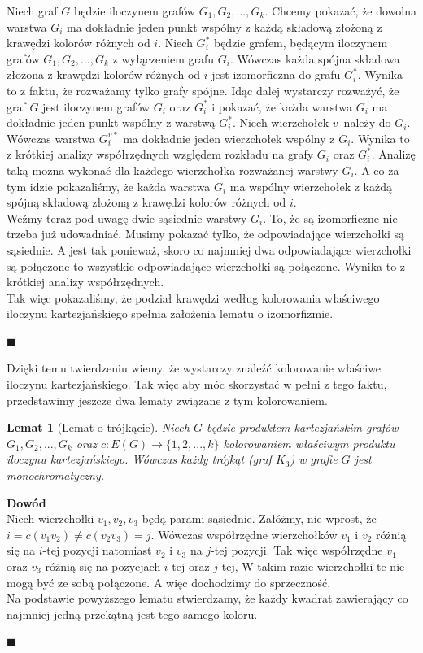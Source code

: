 \documentclass[12pt,a4paper,titlepage]{article}
\newtheorem{lem}[twr]{Lemat}
\newcommand\tab[1][1cm]{\hspace*{#1}}
\begin{document}
\tab[0.6cm]Niech graf $G$ będzie iloczynem grafów $G_1, G_2, ..., G_k$. Chcemy pokazać, że dowolna warstwa $G_i$ ma dokładnie jeden punkt wspólny z każdą składową złożoną z krawędzi kolorów różnych od $i$. Niech $G_i ^*$ będzie grafem, będącym iloczynem grafów $G_1, G_2, ..., G_k$ z wyłączeniem grafu $G_i$. Wówczas każda spójna składowa złożona z krawędzi kolorów różnych od $i$ jest izomorficzna do grafu $G_i^*$. Wynika to z faktu, że rozważamy tylko grafy spójne. Idąc dalej wystarczy rozważyć, że graf $G$ jest iloczynem grafów $G_i$ oraz $G_i^*$ i pokazać, że każda warstwa $G_i$ ma dokładnie jeden punkt wspólny z warstwą $G_i^*$. Niech wierzchołek $v$~należy do $G_i$. Wówczas warstwa $G_i^{v*}$ ma dokładnie jeden wierzchołek wspólny z $G_i$. Wynika to z krótkiej analizy współrzędnych względem rozkładu na grafy $G_i$ oraz $G_i^*$. Analizę taką można wykonać dla każdego wierzchołka rozważanej warstwy $G_i$. A co za tym idzie pokazaliśmy, że każda warstwa $G_i$ ma wspólny wierzchołek z każdą spójną składową złożoną z krawędzi kolorów różnych od $i$.\\
\tab[0.6cm]Weźmy teraz pod uwagę dwie sąsiednie warstwy $G_i$. To, że są izomorficzne nie trzeba już udowadniać. Musimy pokazać tylko, że odpowiadające wierzchołki są sąsiednie. A jest tak ponieważ, skoro co najmniej dwa odpowiadające wierzchołki są połączone to wszystkie odpowiadające wierzchołki są połączone. Wynika to z krótkiej analizy współrzędnych.\\
\tab[0.6cm]Tak więc pokazaliśmy, że podział krawędzi według kolorowania właściwego iloczynu kartezjańskiego spełnia założenia lematu o izomorfizmie.
\begin{flushright}
$\blacksquare$
\end{flushright}
\tab[0.6cm]Dzięki temu twierdzeniu wiemy, że wystarczy znaleźć kolorowanie właściwe iloczynu kartezjańskiego. Tak więc aby móc skorzystać w pełni z tego faktu, przedstawimy jeszcze dwa lematy związane z tym kolorowaniem.\\
\begin{lem}[Lemat o trójkącie]
\label{lem:trojkat}
Niech $G$ będzie produktem kartezjańskim grafów $G_1, G_2, ... , G_k$ oraz $c: E(G) \rightarrow \{1,2,...,k\}$ kolorowaniem właściwym produktu iloczynu kartezjańskiego. Wówczas każdy trójkąt (graf $K_3$) w grafie $G$ jest monochromatyczny.
\end{lem}
\tab[-0.6cm]\textbf{Dowód}\\
\tab[0.6cm]Niech wierzchołki $v_1, v_2, v_3$ będą parami sąsiednie. Załóżmy, nie wprost, że $i=c(v_1 v_2 ) \neq c(v_2 v_3)=j$. Wówczas współrzędne wierzchołków $v_1$ i $v_2$ różnią się na $i$-tej pozycji natomiast $v_2$ i $v_3$ na $j$-tej pozycji. Tak więc współrzędne $v_1$ oraz $v_3$ różnią się na pozycjach $i$-tej oraz $j$-tej, W takim razie wierzchołki te nie mogą być ze sobą połączone. A więc dochodzimy do sprzeczność.\\
Na podstawie powyższego lematu stwierdzamy, że każdy kwadrat zawierający co najmniej jedną przekątną jest tego samego koloru.
\begin{flushright}
$\blacksquare$
\end{flushright}
\end{document}
